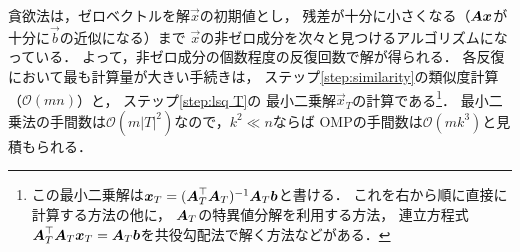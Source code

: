 貪欲法は，ゼロベクトルを解$\vec x$の初期値とし，
残差が十分に小さくなる（$\mbox{\boldmath $A$}\mbox{\boldmath $x$}$が十分に$\vec b$の近似になる）まで
$\vec x$の非ゼロ成分を次々と見つけるアルゴリズムになっている．
よって，非ゼロ成分の個数程度の反復回数で解が得られる．
各反復において最も計算量が大きい手続きは，
ステップ\ref{step:similarity}の類似度計算（$\mathcal{O}(mn)$）と，
ステップ\ref{step:lsq T}の
最小二乗解$\vec x_T$の計算である\footnote{%
この最小二乗解は$\mbox{\boldmath $x$}_T=(\mbox{\boldmath $A$}_T^\top\mbox{\boldmath $A$}_T)^{-1}\mbox{\boldmath $A$}_T\mbox{\boldmath $b$}$と書ける．
これを右から順に直接に計算する方法の他に，
$\mbox{\boldmath $A$}_T$の特異値分解を利用する方法，
連立方程式$\mbox{\boldmath $A$}_T^\top\mbox{\boldmath $A$}_T\mbox{\boldmath $x$}_T=\mbox{\boldmath $A$}_T\mbox{\boldmath $b$}$を共役勾配法で解く方法などがある．}．
最小二乗法の手間数は$\mathcal{O}(m|T|^2)$なので，$k^2\ll n$ならば
OMPの手間数は$\mathcal{O}(mk^3)$と見積もられる．





